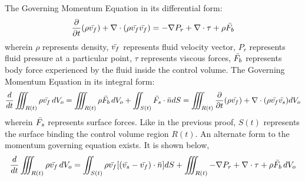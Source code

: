 \documentclass[a4paper, 12pt]{report}
\begin{document}
\begin{center}
\begin{comment}
\end{comment}
The Governing Momentum Equation in its differential form:
$$\frac{\partial}{\partial t} (\rho \bar{v_f}) + \nabla \cdot (\rho\bar{v_f}\bar{v_f}) = -\nabla P_r + \nabla \cdot \tau + \rho \bar{F_b}$$
wherein $\rho$ represents density, $\bar{v_f}$ represents fluid velocity vector, $P_r$ represents fluid pressure at a particular point, $\tau$ represents viscous forces, $\bar{F_b}$ represents body force experienced by the fluid inside the control volume. The Governing Momentum Equation in its integral form:
$$\frac{d}{dt}\iiint_{R(t)}\rho \bar{v_f} \,dV_o = \iiint_{R(t)}\rho \bar{F_b} \,dV_o + \iint_{S(t)} \bar{F_s} \cdot \bar{n}dS = \iiint_{R(t)}\frac{\partial}{\partial t}(\rho \bar{v_f}) + \nabla \cdot (\rho\bar{v_f}\bar{v_s})dV_o$$
wherein $\bar{F_s}$ represents surface forces. Like in the previous proof, $S(t)$ represents the surface binding the control volume region $R(t)$. An alternate form to the momentum governing equation exists. It is shown below,
$$\frac{d}{dt}\iiint_{R(t)}\rho \bar{v_f} \,dV_o = \iint_{S(t)}\rho \bar{v_f}[(\bar{v_s}-\bar{v_f})\cdot\bar{n}]dS + \iiint_{R(t)}-\nabla P_r + \nabla \cdot \tau + \rho \bar{F_b}\,dV_o$$

\end{center}
\end{document}
